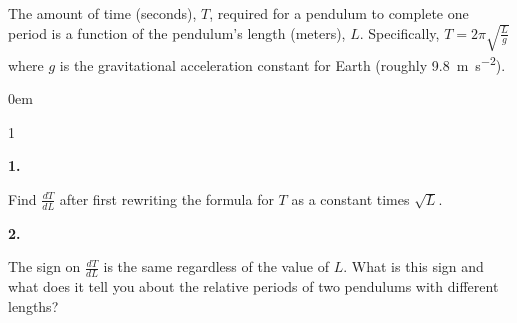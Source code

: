 \documentclass[12pt,]{book}
\theoremstyle{plain}
\theoremstyle{definition}
\numberwithin{equation}{section}
\newenvironment{exercisegroup}%
{\medskip\noindent}%
{\par\bigskip}%
\newlength{\exercisegroupindent}%
\newlength{\exercisegroupitemwidth}%
\newenvironment{exercisegrouplist}%
{\vspace{-\partopsep}%
\begin{adjustwidth}{\exercisegroupindent}{0em}}%
{\end{adjustwidth}%
\vspace{-\partopsep}%
\vspace{\baselineskip}}%
\newenvironment{exercisegroupbycol}[1]%
{\begin{exercisegrouplist}%
\vspace{-\multicolsep}%
\begin{multicols}{#1}%
\setlength{\parindent}{0em}%
\setlength{\exercisegroupitemwidth}{\linewidth}}%
{\end{multicols}%
\vspace{-\multicolsep}%
\end{exercisegrouplist}}%
\newenvironment{exercisegroupitem}[1]%
{\begin{minipage}[t]{\exercisegroupitemwidth}
\vspace{0pt}%
{\bfseries#1}%
\rule{0pt}{\baselineskip}}{\strut%
\end{minipage}%
\hspace{\columnsep}}%
\providecommand\phantomsection{}
\newcommand{\lz}[2]{\frac{d#1}{d#2}}
\begin{document}
\begin{exercisegroup}%
The amount of time (seconds), \(T\), required for a pendulum to complete one period is a function of the pendulum's length (meters), \(L\).  Specifically, \(T=2\pi\sqrt{\frac{L}{g}}\) where \(g\) is the gravitational acceleration constant for Earth (roughly \SI{9.8}{\meter\per\second\tothe{2}}).%
\par
\begin{exercisegroupbycol}{1}%
\begin{exercisegroupitem}{1. }\phantomsection\hypertarget{exercise-331}{\null}
Find \(\lz{T}{L}\) after first rewriting the formula for \(T\) as a constant times \(\sqrt{L}\).%
\end{exercisegroupitem}%
\par%
\begin{exercisegroupitem}{2. }\phantomsection\hypertarget{exercise-332}{\null}
The sign on \(\lz{T}{L}\) is the same regardless of the value of \(L\).  What is this sign and what does it tell you about the relative periods of two pendulums with different lengths?%
\end{exercisegroupitem}%
\par%
\end{exercisegroupbycol}%
\end{exercisegroup}%
\end{document}
